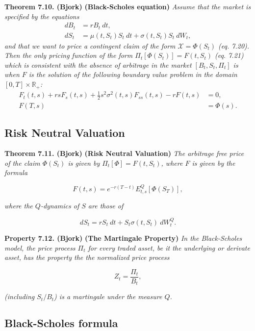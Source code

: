 \documentclass[a4paper,12pt,openany]{book}
\begin{document}
\textbf{Theorem 7.10. (Bjork)} \textbf{(Black-Scholes equation)} \emph{Assume that the market is specified by the equations}
\begin{align*}
dB_t&=rB_t\ dt,\tag{7.18}\\
dS_t&=\mu(t,S_t) S_t\ dt+\sigma(t,S_t)S_t\ dW_t,\tag{7.19}
\end{align*}
\emph{and that we want to price a contingent claim of the form \(\mathcal{X}=\Phi(S_t)\) (eq. 7.20). Then the only pricing function of the form \(\Pi_t[\Phi(S_t)]=F(t,S_t)\) (eq. 7.21) which is consistent with the absence of arbitrage in the market \([B_t,S_t,\Pi_t]\) is when \(F\) is the solution of the following boundary value problem in the domain \([0,T]\times\mathbb{R}_+\):}
\begin{align*}
F_t(t,s)+rsF_s(t,s)+\frac{1}{2}s^2\sigma^2(t,s)F_{ss}(t,s)-rF(t,s)&=0,\\
F(T,s)&=\Phi(s).
\end{align*}

\hypertarget{risk-neutral-valuation-1}{%
\subsection{Risk Neutral Valuation}\label{risk-neutral-valuation-1}}

\textbf{Theorem 7.11. (Bjork)} \textbf{(Risk Neutral Valuation)} \emph{The arbitrage free price of the claim \(\Phi(S_t)\) is given by \(\Pi_t[\Phi]=F(t,S_t)\), where \(F\) is given by the formula}

\[
F(t,s)=e^{-r(T-t)}E^Q_{t,s}[\Phi(S_T)],\tag{7.43}
\]

\emph{where the \(Q\)-dynamics of \(S\) are those of}

\[
dS_t=rS_t\ dt+S_t\sigma(t,S_t)\ dW_t^Q.\tag{7.42}
\]

\textbf{Property 7.12. (Bjork)} \textbf{(The Martingale Property)} \emph{In the Black-Scholes model, the price process \(\Pi_t\) for every traded asset, be it the underlying or derivate asset, has the property the the normalized price process}

\[
Z_t=\frac{\Pi_t}{B_t},
\]

\emph{(including \(S_t/B_t\)) is a martingale under the measure \(Q\).}

\hypertarget{black-scholes-formula}{%
\subsection{Black-Scholes formula}\label{black-scholes-formula}}
\end{document}
